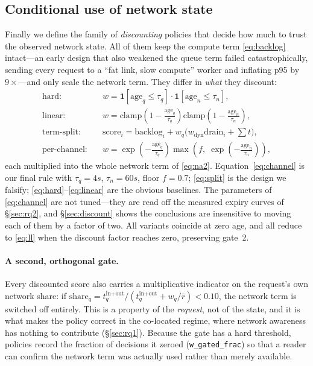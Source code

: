\subsection{Conditional use of network state}
\label{sec:policy:adaptive}
Finally we define the family of \emph{discounting} policies that decide how much to trust the
observed network state. All of them keep the compute term \eqref{eq:backlog} intact---an early
design that also weakened the queue term failed catastrophically, sending every request to a
``fat link, slow compute'' worker and inflating p95 by $9\times$---and only scale the network
term. They differ in \emph{what} they discount:
\begin{align}
  \text{hard:} \quad & w = \mathbf{1}[\text{age}_q \le \tau_q]\cdot\mathbf{1}[\text{age}_n \le \tau_n], \label{eq:hard}\\
  \text{linear:} \quad & w = \mathrm{clamp}\!\left(1-\tfrac{\text{age}_q}{\tau_q}\right)\mathrm{clamp}\!\left(1-\tfrac{\text{age}_n}{\tau_n}\right), \label{eq:linear}\\
  \text{term-split:} \quad & \text{score}_i = \text{backlog}_i + w_q\big(w_{\text{dyn}}\text{drain}_i + \textstyle\sum t\big), \label{eq:split}\\
  \text{per-channel:} \quad & w = \exp\!\left(-\tfrac{\text{age}_q}{\tau_q}\right)\max\!\left(f,\; \exp\!\left(-\tfrac{\text{age}_n}{\tau_n}\right)\right), \label{eq:channel}
\end{align}
each multiplied into the whole network term of \eqref{eq:na2}. Equation~\eqref{eq:channel} is
our final rule with $\tau_q = 4 s$, $\tau_n = 60 s$, floor $f = 0.7$;
\eqref{eq:split} is the design we falsify; \eqref{eq:hard}--\eqref{eq:linear} are the obvious
baselines. The parameters of \eqref{eq:channel} are not tuned---they are read off the measured
expiry curves of \S\ref{sec:rq2}, and \S\ref{sec:discount} shows the conclusions are insensitive
to moving each of them by a factor of two. All variants coincide at zero age, and all reduce to
\eqref{eq:ll} when the discount factor reaches zero, preserving gate~2.

\paragraph{A second, orthogonal gate.}
Every discounted score also carries a multiplicative indicator on the request's own network
share: if $\text{share}_q = t^{\text{in}+\text{out}}_q /
(t^{\text{in}+\text{out}}_q + w_q/\bar r) < 0.10$, the network term is switched off entirely.
This is a property of the \emph{request}, not of the state, and it is what makes the policy
correct in the co-located regime, where network awareness has nothing to contribute
(\S\ref{sec:rq1}). Because the gate has a hard threshold, policies record the fraction of
decisions it zeroed (\texttt{w\_gated\_frac}) so that a reader can confirm the network term was
actually used rather than merely available.
